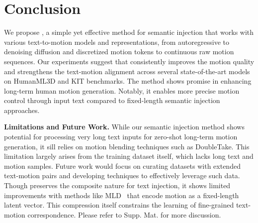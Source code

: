 \vspace{-5pt}
\section{Conclusion} \label{sec:conclusion}
\vspace{-3pt}

We propose {\modulename}, a simple yet effective method for semantic injection that works with various text-to-motion models and representations, from autoregressive to denoising diffusion and discretized motion tokens to continuous raw motion sequences.
Our experiments suggest that {\modulename} consistently improves the motion quality and strengthens the text-motion alignment across several state-of-the-art models on HumanML3D and KIT benchmarks.
The method shows promise in enhancing long-term human motion generation. 
Notably, it enables more precise motion control through input text compared to fixed-length semantic injection approaches.


\textbf{Limitations and Future Work.} While our semantic injection method shows potential for processing very long text inputs for zero-shot long-term motion generation, it sill relies on motion blending techniques such as DoubleTake.
This limitation largely arises from the training dataset itself, which lacks long text and motion samples. 
Future work would focus on curating datasets with extended text-motion pairs and developing techniques to effectively leverage such data.
Though {\modulename} preserves the composite nature for text injection, it shows limited improvements with methods like MLD~\cite{chen2023executing} that encode motion as a fixed-length latent vector.
This compression itself constrains the learning of fine-grained text-motion correspondence. Please refer to Supp. Mat. for more discussion.





